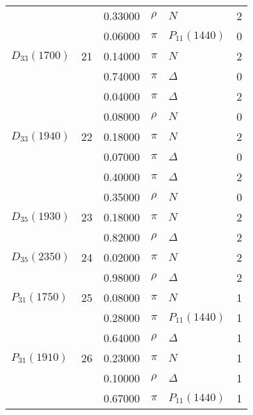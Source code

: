 \documentclass[a4paper,10pt]{article}
\begin{document}
\begin{tabular}[t]{lrllll}
$                    $&   & 0.33000&$ \rho                $ &$ N                   $& 2\\
$                    $&   & 0.06000&$ \pi                 $ &$ P_{11}(1440)        $& 0\\
\midrule
$      D_{33}(1700)  $& 21& 0.14000&$ \pi                 $ &$ N                   $& 2\\
$                    $&   & 0.74000&$ \pi                 $ &$ \Delta              $& 0\\
$                    $&   & 0.04000&$ \pi                 $ &$ \Delta              $& 2\\
$                    $&   & 0.08000&$ \rho                $ &$ N                   $& 0\\
\midrule
$      D_{33}(1940)  $& 22& 0.18000&$ \pi                 $ &$ N                   $& 2\\
$                    $&   & 0.07000&$ \pi                 $ &$ \Delta              $& 0\\
$                    $&   & 0.40000&$ \pi                 $ &$ \Delta              $& 2\\
$                    $&   & 0.35000&$ \rho                $ &$ N                   $& 0\\
\midrule
$      D_{35}(1930)  $& 23& 0.18000&$ \pi                 $ &$ N                   $& 2\\
$                    $&   & 0.82000&$ \rho                $ &$ \Delta              $& 2\\
\midrule
$      D_{35}(2350)  $& 24& 0.02000&$ \pi                 $ &$ N                   $& 2\\
$                    $&   & 0.98000&$ \rho                $ &$ \Delta              $& 2\\
\midrule
$      P_{31}(1750)  $& 25& 0.08000&$ \pi                 $ &$ N                   $& 1\\
$                    $&   & 0.28000&$ \pi                 $ &$ P_{11}(1440)        $& 1\\
$                    $&   & 0.64000&$ \rho                $ &$ \Delta              $& 1\\
\midrule
$      P_{31}(1910)  $& 26& 0.23000&$ \pi                 $ &$ N                   $& 1\\
$                    $&   & 0.10000&$ \rho                $ &$ \Delta              $& 1\\
$                    $&   & 0.67000&$ \pi                 $ &$ P_{11}(1440)        $& 1\\

\end{tabular}
\end{document}
